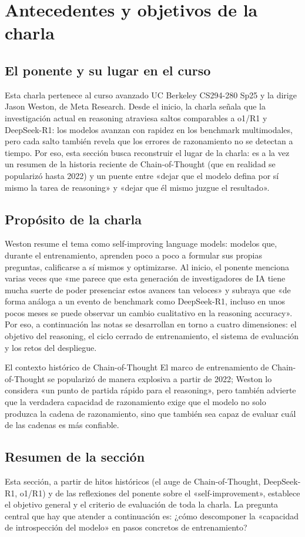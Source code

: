 \section{Antecedentes y objetivos de la charla}
\subsection{El ponente y su lugar en el curso}
Esta charla pertenece al curso avanzado UC Berkeley CS294-280 Sp25 y la dirige Jason Weston, de Meta Research. Desde el inicio, la charla señala que la investigación actual en reasoning atraviesa saltos comparables a o1/R1 y DeepSeek-R1: los modelos avanzan con rapidez en los benchmark multimodales, pero cada salto también revela que los errores de razonamiento no se detectan a tiempo. Por eso, esta sección busca reconstruir el lugar de la charla: es a la vez un resumen de la historia reciente de Chain-of-Thought (que en realidad se popularizó hasta 2022) y un puente entre «dejar que el modelo defina por sí mismo la tarea de reasoning» y «dejar que él mismo juzgue el resultado».

\subsection{Propósito de la charla}
Weston resume el tema como self-improving language models: modelos que, durante el entrenamiento, aprenden poco a poco a formular sus propias preguntas, calificarse a sí mismos y optimizarse. Al inicio, el ponente menciona varias veces que «me parece que esta generación de investigadores de IA tiene mucha suerte de poder presenciar estos avances tan veloces» y subraya que «de forma análoga a un evento de benchmark como DeepSeek-R1, incluso en unos pocos meses se puede observar un cambio cualitativo en la reasoning accuracy». Por eso, a continuación las notas se desarrollan en torno a cuatro dimensiones: el objetivo del reasoning, el ciclo cerrado de entrenamiento, el sistema de evaluación y los retos del despliegue.

\begin{knowledgebox}{El contexto histórico de Chain-of-Thought}
El marco de entrenamiento de Chain-of-Thought se popularizó de manera explosiva a partir de 2022; Weston lo considera «un punto de partida rápido para el reasoning», pero también advierte que la verdadera capacidad de razonamiento exige que el modelo no solo produzca la cadena de razonamiento, sino que también sea capaz de evaluar cuál de las cadenas es más confiable.
\end{knowledgebox}

\subsection{Resumen de la sección}
Esta sección, a partir de hitos históricos (el auge de Chain-of-Thought, DeepSeek-R1, o1/R1) y de las reflexiones del ponente sobre el «self-improvement», establece el objetivo general y el criterio de evaluación de toda la charla. La pregunta central que hay que atender a continuación es: ¿cómo descomponer la «capacidad de introspección del modelo» en pasos concretos de entrenamiento?
